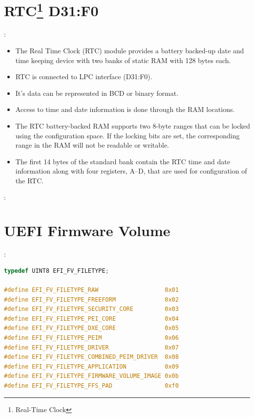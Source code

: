 \section[RTC]{RTC\protect\footnote{Real-Time Clock} D31:F0}
\begin{note}:
\begin{itemize}
	\item The Real Time Clock (RTC) module provides a battery backed-up date and time keeping
	device with two banks of static RAM with 128 bytes each.
	\item RTC is connected to LPC interface (D31:F0).
	\item It's data can	be represented in BCD or binary format.
	\item Access to time and date information is done through the RAM locations.
	\item The RTC battery-backed RAM supports two 8-byte ranges that can be locked using the configuration space. If the locking bits are set, the corresponding range in the RAM will not be readable or writable.
	\item The first 14 bytes of the standard bank contain the RTC time and date information along with four registers, A–D, that are used for configuration of the RTC.
\end{itemize}
\end{note}
\begin{note}:
	
\end{note}
\section{UEFI Firmware Volume}
\begin{note}:
\begin{lstlisting}[language=C]
typedef UINT8 EFI_FV_FILETYPE;

#define EFI_FV_FILETYPE_RAW                   0x01
#define EFI_FV_FILETYPE_FREEFORM              0x02
#define EFI_FV_FILETYPE_SECURITY_CORE         0x03
#define EFI_FV_FILETYPE_PEI_CORE              0x04
#define EFI_FV_FILETYPE_DXE_CORE              0x05
#define EFI_FV_FILETYPE_PEIM                  0x06
#define EFI_FV_FILETYPE_DRIVER                0x07
#define EFI_FV_FILETYPE_COMBINED_PEIM_DRIVER  0x08
#define EFI_FV_FILETYPE_APPLICATION           0x09
#define EFI_FV_FILETYPE_FIRMWARE_VOLUME_IMAGE 0x0b
#define EFI_FV_FILETYPE_FFS_PAD               0xf0
\end{lstlisting}
\end{note}
